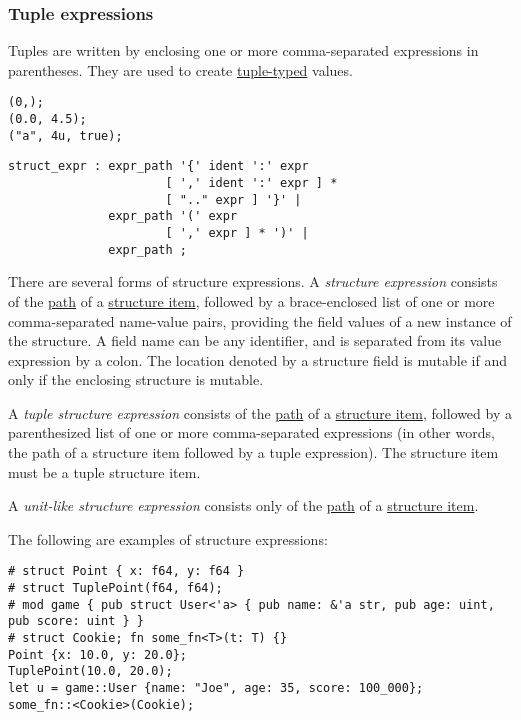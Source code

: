 \documentclass[]{article}
\begin{document}
\subsubsection{Tuple expressions}\label{tuple-expressions}

Tuples are written by enclosing one or more comma-separated expressions
in parentheses. They are used to create
\hyperref[tuple-types]{tuple-typed} values.

\begin{verbatim}
(0,);
(0.0, 4.5);
("a", 4u, true);
\end{verbatim}


\begin{verbatim}
struct_expr : expr_path '{' ident ':' expr
                      [ ',' ident ':' expr ] *
                      [ ".." expr ] '}' |
              expr_path '(' expr
                      [ ',' expr ] * ')' |
              expr_path ;
\end{verbatim}

There are several forms of structure expressions. A \emph{structure
expression} consists of the \hyperref[paths]{path} of a
\hyperref[structures]{structure item}, followed by a brace-enclosed list
of one or more comma-separated name-value pairs, providing the field
values of a new instance of the structure. A field name can be any
identifier, and is separated from its value expression by a colon. The
location denoted by a structure field is mutable if and only if the
enclosing structure is mutable.

A \emph{tuple structure expression} consists of the
\hyperref[paths]{path} of a \hyperref[structures]{structure item},
followed by a parenthesized list of one or more comma-separated
expressions (in other words, the path of a structure item followed by a
tuple expression). The structure item must be a tuple structure item.

A \emph{unit-like structure expression} consists only of the
\hyperref[paths]{path} of a \hyperref[structures]{structure item}.

The following are examples of structure expressions:

\begin{verbatim}
# struct Point { x: f64, y: f64 }
# struct TuplePoint(f64, f64);
# mod game { pub struct User<'a> { pub name: &'a str, pub age: uint, pub score: uint } }
# struct Cookie; fn some_fn<T>(t: T) {}
Point {x: 10.0, y: 20.0};
TuplePoint(10.0, 20.0);
let u = game::User {name: "Joe", age: 35, score: 100_000};
some_fn::<Cookie>(Cookie);
\end{verbatim}
\end{document}
